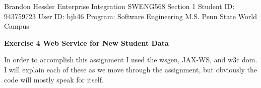 \documentclass [a4paper,12pt,oneside,final]{book}
\begin{document}
	\noindent
	Brandon Hessler \newline
	Enterprise Integration\newline
	SWENG568 Section 1 \newline
	\newline
	Student ID: 943759723 \newline
	User ID: bjh46 \newline
	Program: Software Engineering M.S. \newline
	Penn State World Campus
	\vspace{10mm}

	\noindent
	\LARGE\bf Exercise 4
	\newline
	\large\bf Web Service for New Student Data
	\newline
	
	In order to accomplish this assignment I used the wsgen, JAX-WS, and w3c dom. I will explain each of these as we move through the assignment, but obviously the code will mostly speak for itself.
\end{document}
